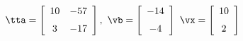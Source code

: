{$\tta = \left[ \begin {array}{cc} 10&-57\\\noalign{\medskip}3&-17\end {array}
 \right],$
 \quad
$\vb =\left[ \begin {array}{c} -14\\\noalign{\medskip}-4\end {array}
 \right]$ 
}
{$\vx = \left[ \begin {array}{c} 10\\\noalign{\medskip}2\end {array} \right]$}
 